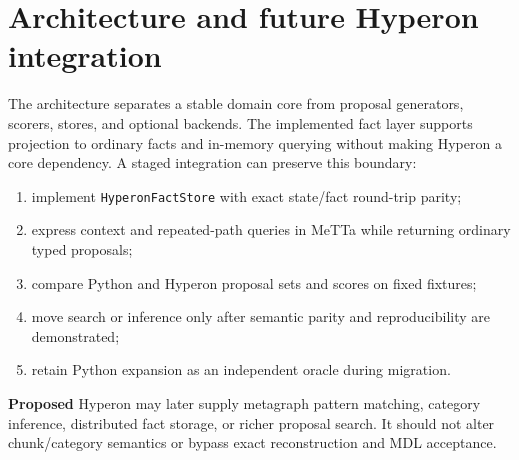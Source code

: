 \documentclass[11pt]{article}
\newcommand{\Proposed}{\textbf{Proposed}}
\begin{document}
\section{Architecture and future Hyperon integration}
The architecture separates a stable domain core from proposal generators, scorers, stores, and optional backends. The implemented fact layer supports projection to ordinary facts and in-memory querying without making Hyperon a core dependency. A staged integration can preserve this boundary:
\begin{enumerate}[leftmargin=*]
\item implement \texttt{HyperonFactStore} with exact state/fact round-trip parity;
\item express context and repeated-path queries in MeTTa while returning ordinary typed proposals;
\item compare Python and Hyperon proposal sets and scores on fixed fixtures;
\item move search or inference only after semantic parity and reproducibility are demonstrated;
\item retain Python expansion as an independent oracle during migration.
\end{enumerate}
\Proposed{} Hyperon may later supply metagraph pattern matching, category inference, distributed fact storage, or richer proposal search. It should not alter chunk/category semantics or bypass exact reconstruction and MDL acceptance.
\end{document}
